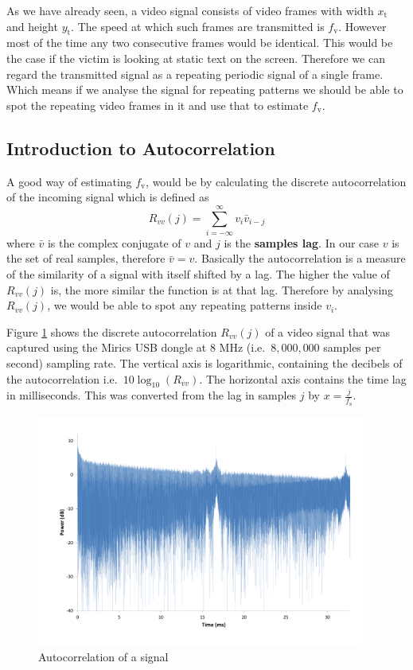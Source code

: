 \documentclass[a4paper,12pt,twoside,openright]{report}
\begin{document}
As we have already seen, a video signal consists of video frames with width $x_\text{t}$ and height $y_\text{t}$. The speed at which such frames are transmitted is $f_\text{v}$. However most of the time any two consecutive frames would be identical. This would be the case if the victim is looking at static text on the screen. Therefore we can regard the transmitted signal as a repeating periodic signal of a single frame. Which means if we analyse the signal for repeating patterns we should be able to spot the repeating video frames in it and use that to estimate $f_\text{v}$.

\subsection{Introduction to Autocorrelation}
A good way of estimating $f_\text{v}$, would be by calculating the discrete autocorrelation \cite{bracewell1965autocorrelation} of the incoming signal which is defined as 
\begin{equation}
\label{eq:autocorrelationdef}
R_{vv}(j)=\sum\limits_{i=-\infty}^{\infty} v_{i} \bar{v}_{i-j}
\end{equation}
where $\bar{v}$ is the complex conjugate of $v$ and $j$ is the \textbf{samples lag}. In our case $v$ is the set of real samples, therefore $\bar{v} = v$. Basically the autocorrelation is a measure of the similarity of a signal with itself shifted by a lag. The higher the value of $R_{vv}(j)$ is, the more similar the function is at that lag. Therefore by analysing $R_{vv}(j)$, we would be able to spot any repeating patterns inside $v_{i}$.

Figure \ref{fig:autocorr} shows the discrete autocorrelation $R_{vv}(j)$ of a video signal that was captured using the Mirics USB dongle at 8 MHz (i.e.\  $8,000,000$ samples per second) sampling rate. The vertical axis is logarithmic, containing the decibels of the autocorrelation i.e.\  $10 \log_{10}( R_{vv} )$. The horizontal axis contains the time lag in milliseconds. This was converted from the lag in samples $j$ by $x = \frac{j}{f_\text{s}}$.

\begin{figure}[h]
\centering
  \includegraphics[width=0.96\textwidth]{autocorr}
  \caption{Autocorrelation of a signal}
  \label{fig:autocorr}
\end{figure}
\end{document}
